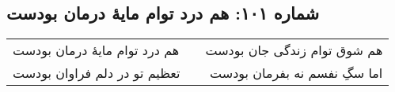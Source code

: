 \begin{center}
\section*{شماره ۱۰۱: هم درد توام مایۀ درمان بودست}
\label{sec:101}
\begin{longtable}{l p{0.5cm} r}
هم درد توام مایهٔ درمان بودست
&&
هم شوق توام زندگی جان بودست
\\
تعظیم تو در دلم فراوان بودست
&&
اما سگِ نفسم نه بفرمان بودست
\\
\end{longtable}
\end{center}
